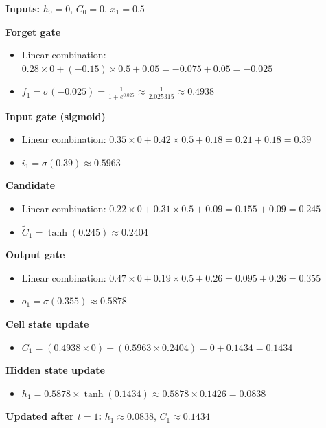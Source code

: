 \documentclass[12pt]{article}
\begin{document}
\textbf{Inputs:} $h_0 = 0$, $C_0 = 0$, $x_1 = 0.5$

\textcolor{headingRed}{\textbf{Forget gate}}
\begin{itemize}[leftmargin=*]
    \item Linear combination: $0.28 \times 0 + (-0.15) \times 0.5 + 0.05 = -0.075 + 0.05 = -0.025$
    \item $f_1 = \sigma(-0.025) = \frac{1}{1 + e^{0.025}} \approx \frac{1}{2.025315} \approx 0.4938$
\end{itemize}

\textcolor{headingRed}{\textbf{Input gate (sigmoid)}}
\begin{itemize}[leftmargin=*]
    \item Linear combination: $0.35 \times 0 + 0.42 \times 0.5 + 0.18 = 0.21 + 0.18 = 0.39$
    \item $i_1 = \sigma(0.39) \approx 0.5963$
\end{itemize}

\textcolor{headingRed}{\textbf{Candidate}}
\begin{itemize}[leftmargin=*]
    \item Linear combination: $0.22 \times 0 + 0.31 \times 0.5 + 0.09 = 0.155 + 0.09 = 0.245$
    \item $\tilde{C}_1 = \tanh(0.245) \approx 0.2404$
\end{itemize}

\textcolor{headingRed}{\textbf{Output gate}}
\begin{itemize}[leftmargin=*]
    \item Linear combination: $0.47 \times 0 + 0.19 \times 0.5 + 0.26 = 0.095 + 0.26 = 0.355$
    \item $o_1 = \sigma(0.355) \approx 0.5878$
\end{itemize}

\textcolor{headingRed}{\textbf{Cell state update}}
\begin{itemize}[leftmargin=*]
    \item $C_1 = (0.4938 \times 0) + (0.5963 \times 0.2404) = 0 + 0.1434 = 0.1434$
\end{itemize}

\textcolor{headingRed}{\textbf{Hidden state update}}
\begin{itemize}[leftmargin=*]
    \item $h_1 = 0.5878 \times \tanh(0.1434) \approx 0.5878 \times 0.1426 = 0.0838$
\end{itemize}

\textbf{Updated after $t=1$:} $h_1 \approx 0.0838$, $C_1 \approx 0.1434$
\end{document}

